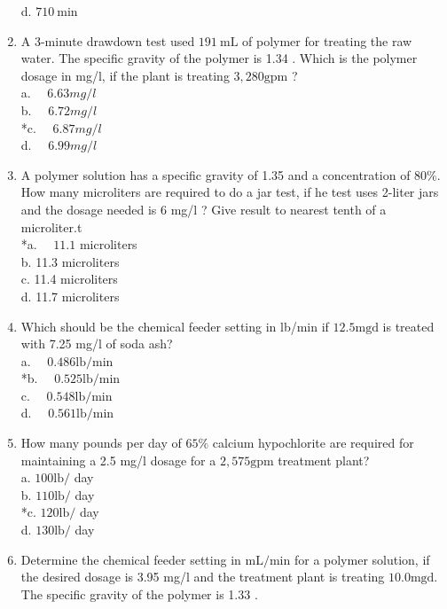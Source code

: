 \begin{enumerate}
d. $710 \mathrm{~min}$\\
  \item A 3-minute drawdown test used $191 \mathrm{~mL}$ of polymer for treating the raw water. The specific gravity of the polymer is 1.34 . Which is the polymer dosage in mg/l, if the plant is treating $3,280 \mathrm{gpm}$ ?\\
a. $\quad 6.63 mg/l$\\
b. $\quad 6.72 mg/l$\\
*c. $\quad 6.87 mg/l$\\
d. $\quad 6.99 mg/l$\\
  \item A polymer solution has a specific gravity of 1.35 and a concentration of $80 \%$. How many microliters are required to do a jar test, if he test uses 2-liter jars and the dosage needed is 6 mg/l ? Give result to nearest tenth of a microliter.t\\
*a. $\quad 11.1$ microliters\\
b. 11.3 microliters\\
c. 11.4 microliters\\
d. 11.7 microliters \\
\item Which should be the chemical feeder setting in lb/min if $12.5 \mathrm{mgd}$ is treated with 7.25 mg/l of soda ash?\\
a. $\quad 0.486 \mathrm{lb} / \mathrm{min}$\\
*b. $\quad 0.525 \mathrm{lb} / \mathrm{min}$\\
c. $\quad 0.548 \mathrm{lb} / \mathrm{min}$\\
d. $\quad 0.561 \mathrm{lb} / \mathrm{min}$\\
  \item How many pounds per day of $65 \%$ calcium hypochlorite are required for maintaining a 2.5 mg/l dosage for a $2,575 \mathrm{gpm}$ treatment plant?\\
a. $100 \mathrm{lb} /$ day\\
b. $110 \mathrm{lb} /$ day\\
*c. $120 \mathrm{lb} /$ day\\
d. $130 \mathrm{lb} /$ day\\
  \item Determine the chemical feeder setting in $\mathrm{mL} / \mathrm{min}$ for a polymer solution, if the desired dosage is 3.95 mg/l and the treatment plant is treating $10.0 \mathrm{mgd}$. The specific gravity of the polymer is 1.33 .\\

\end{enumerate}
